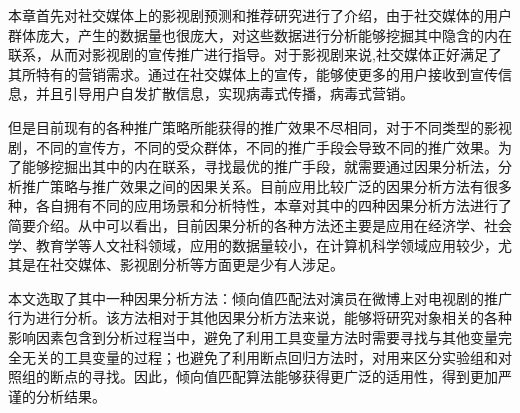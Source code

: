 本章首先对社交媒体上的影视剧预测和推荐研究进行了介绍，由于社交媒体的用户群体庞大，产生的数据量也很庞大，对这些数据进行分析能够挖掘其中隐含的内在联系，从而对影视剧的宣传推广进行指导。对于影视剧来说,社交媒体正好满足了其所特有的营销需求。通过在社交媒体上的宣传，能够使更多的用户接收到宣传信息，并且引导用户自发扩散信息，实现病毒式传播，病毒式营销。

但是目前现有的各种推广策略所能获得的推广效果不尽相同，对于不同类型的影视剧，不同的宣传方，不同的受众群体，不同的推广手段会导致不同的推广效果。为了能够挖掘出其中的内在联系，寻找最优的推广手段，就需要通过因果分析法，分析推广策略与推广效果之间的因果关系。目前应用比较广泛的因果分析方法有很多种，各自拥有不同的应用场景和分析特性，本章对其中的四种因果分析方法进行了简要介绍。从中可以看出，目前因果分析的各种方法还主要是应用在经济学、社会学、教育学等人文社科领域，应用的数据量较小，在计算机科学领域应用较少，尤其是在社交媒体、影视剧分析等方面更是少有人涉足。

本文选取了其中一种因果分析方法：倾向值匹配法对演员在微博上对电视剧的推广行为进行分析。该方法相对于其他因果分析方法来说，能够将研究对象相关的各种影响因素包含到分析过程当中，避免了利用工具变量方法时需要寻找与其他变量完全无关的工具变量的过程；也避免了利用断点回归方法时，对用来区分实验组和对照组的断点的寻找。因此，倾向值匹配算法能够获得更广泛的适用性，得到更加严谨的分析结果。




























































